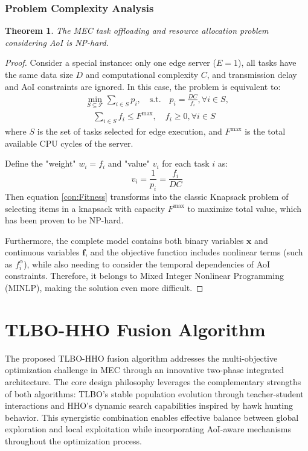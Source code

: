 \documentclass[conference]{IEEEtran}
\newtheorem{theorem}{Theorem}
\newtheorem{proof}{Proof}
\begin{document}
\subsubsection{Problem Complexity Analysis}
\begin{theorem}
The MEC task offloading and resource allocation problem considering AoI is NP-hard.
\end{theorem}
\begin{proof}
    Consider a special instance: only one edge server ($E = 1$), all tasks have the same data size $D$ and computational complexity $C$, and transmission delay and AoI constraints are ignored. In this case, the problem is equivalent to:
\begin{equation}
    \begin{split}
        \min_{S \subseteq \mathcal{T}} \sum_{i \in S} p_i, \quad
        \text{s.t.} \quad p_i = \frac{DC}{f_i}, \forall i \in S, \\
        \quad
        \sum_{i \in S} f_i \leq F^{\max}, \quad
        f_i \geq 0, \forall i \in S
    \end{split}
\end{equation}
where $S$ is the set of tasks selected for edge execution, and $F^{\max}$ is the total available CPU cycles of the server.

Define the "weight" $w_i = f_i$ and "value" $v_i$ for each task $i$ as:
\begin{equation}
v_i = \frac{1}{p_i} = \frac{f_i}{DC}
\end{equation}
Then equation \ref{con:Fitness} transforms into the classic Knapsack problem of selecting items in a knapsack with capacity $F^{\max}$ to maximize total value, which has been proven to be NP-hard.

Furthermore, the complete model contains both binary variables $\mathbf{x}$ and continuous variables $\mathbf{f}$, and the objective function includes nonlinear terms (such as $f_i^{\alpha}$), while also needing to consider the temporal dependencies of AoI constraints. Therefore, it belongs to Mixed Integer Nonlinear Programming (MINLP), making the solution even more difficult.
\end{proof}


\section{TLBO-HHO Fusion Algorithm}

The proposed TLBO-HHO fusion algorithm addresses the multi-objective optimization challenge in MEC through an innovative two-phase integrated architecture. The core design philosophy leverages the complementary strengths of both algorithms: TLBO's stable population evolution through teacher-student interactions and HHO's dynamic search capabilities inspired by hawk hunting behavior. This synergistic combination enables effective balance between global exploration and local exploitation while incorporating AoI-aware mechanisms throughout the optimization process.
\end{document}
